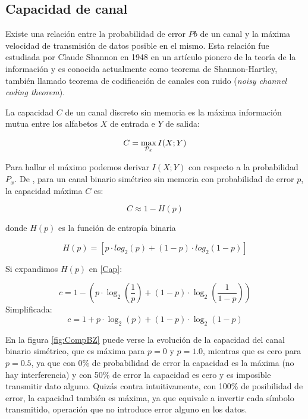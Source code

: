 \fi
\subsection{Capacidad de canal}

Existe una relación entre la probabilidad de error $Pb$ de un canal y la máxima velocidad de transmisión de datos posible en el mismo.
Esta relación fue estudiada por Claude Shannon en 1948 en un artículo pionero de la teoría de la información \cite{shannon48} y es conocida actualmente como teorema de Shannon-Hartley, también llamado teorema de codificación de canales con ruido (\textit{noisy channel coding theorem}).

La capacidad $C$ de un canal discreto sin memoria es la máxima información mutua entre los alfabetos $X$ de entrada e $Y$ de salida:

\begin{equation}
C = \max_{{\cal{P}}_x} I(X;Y) 
\end{equation}

Para hallar el máximo podemos derivar $I(X;Y)$ con respecto a la probabilidad $P_x$.
De \cite{MacKay:2002}, para un canal binario simétrico sin memoria con probabilidad de error $p$, la capacidad máxima $C$ es:

\begin{equation}\label{Cap}
C \approx 1 - H(p) 
\end{equation}

donde $H(p)$ es la función de entropía binaria

\begin{equation}\label{Hp}
 H(p) = [p \cdot log_2(p) + (1-p)\cdot log_2 (1-p)]
\end{equation}

Si expandimos $H(p)$ en \ref{Cap}:

$$ c = 1-\left(p \cdot \log_2\left(\frac{1}{p}\right) + (1-p) \cdot \log_2\left(\frac{1}{1-p}\right)\right) $$
Simplificada:
$$ c = 1 + p \cdot \log_2(p) + (1 - p) \cdot \log_2(1-p) $$

En la figura \ref{fig:CompBZ} puede verse la evolución de la capacidad del canal binario simétrico, que es máxima para $p=0$ y $p=1.0$, mientras que es cero para $p=0.5$, ya que con 0\% de probabilidad de error la capacidad es la máxima (no hay interferencia) y con 50\% de error la capacidad es cero y es imposible transmitir dato alguno. Quizás contra intuitivamente, con 100\% de posibilidad de error, la capacidad también es máxima, ya que equivale a invertir cada símbolo transmitido, operación que no introduce error alguno en los datos.


